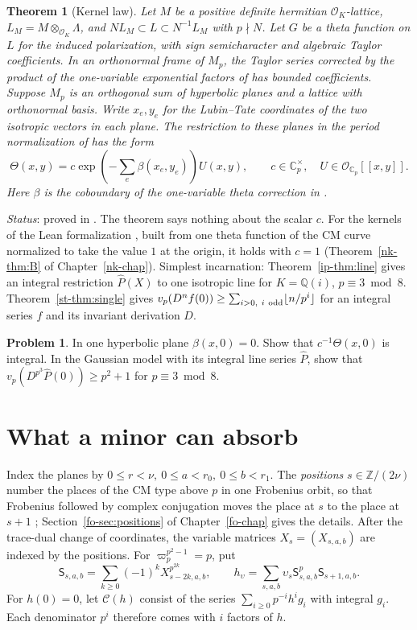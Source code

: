 \documentclass[reqno]{amsart}
\newcounter{chap}
\theoremstyle{definition}
\newtheorem{problem}{Problem}[section]
\theoremstyle{plain}
\newtheorem{theorem}{Theorem}[section]
\newcommand{\Z}{\mathbb Z}
\newcommand{\Q}{\mathbb Q}
\newcommand{\Oc}{\mathcal O}
\begin{document}
\begin{theorem}[Kernel law]\label{thm:kernel}
Let \(M\) be a positive definite hermitian \(\Oc_K\)-lattice, \(L_M=M\otimes_{\Oc_K}\Lambda\), and \(NL_M\subset L\subset N^{-1}L_M\) with \(p\nmid N\). Let \(G\) be a theta function on \(L\) for the induced polarization, with sign semicharacter and algebraic Taylor coefficients. In an orthonormal frame of \(M_p\), the Taylor series corrected by the product of the one-variable exponential factors of \cite[Thm.~8.19]{Adr} has bounded coefficients. Suppose \(M_p\) is an orthogonal sum of hyperbolic planes and a lattice with orthonormal basis. Write \(x_e,y_e\) for the Lubin--Tate coordinates of the two isotropic vectors in each plane. The restriction to these planes in the period normalization of \cite[Thm.~8.21]{Adr} has the form
\[
 \Theta(x,y)=c\exp\!\left(-\sum_e\beta(x_e,y_e)\right)U(x,y),
 \qquad c\in\mathbb C_p^\times,\quad U\in\Oc_{\mathbb C_p}[[x,y]] .
\]
Here \(\beta\) is the coboundary of the one-variable theta correction in \cite[Eq.~(8.6)]{Adr}.
\end{theorem}
\noindent \emph{Status}: proved in \cite{Adr}.  The theorem says nothing about the scalar \(c\).  For the kernels of the Lean formalization \cite{Lean}, built from one theta function of the CM curve normalized to take the value \(1\) at the origin, it holds with \(c=1\) (Theorem~\ref{nk-thm:B} of Chapter~\ref{nk-chap}).  Simplest incarnation: Theorem~\ref{ip-thm:line} gives an integral restriction \(\widehat P(X)\) to one isotropic line for \(K=\Q(i)\), \(p\equiv3\bmod8\). Theorem~\ref{st-thm:single} gives \(v_p(D^n f(0))\ge\sum_{i>0,\ i\ {\rm odd}}\lfloor n/p^i\rfloor\) for an integral series \(f\) and its invariant derivation \(D\).

\begin{problem}\label{pr:line}
In one hyperbolic plane \(\beta(x,0)=0\). Show that \(c^{-1}\Theta(x,0)\) is integral. In the Gaussian model with its integral line series \(\widehat P\), show that \(v_p(D^{p^3}\widehat P(0))\ge p^2+1\) for \(p\equiv3\bmod8\).
\end{problem}

\section{What a minor can absorb}\label{sec:minors}
Index the planes by \(0\le r<\nu,\ 0\le a<r_0,\ 0\le b<r_1\). The \emph{positions} \(s\in\Z/(2\nu)\) number the places of the CM type above \(p\) in one Frobenius orbit, so that Frobenius followed by complex conjugation moves the place at \(s\) to the place at \(s+1\) \cite[\S11.1]{Adr}; Section~\ref{fo-sec:positions} of Chapter~\ref{fo-chap} gives the details.  After the trace-dual change of coordinates, the variable matrices \(X_s=(X_{s,a,b})\) are indexed by the positions. For \(\varpi_p^{p^2-1}=p\), put
\[
 \mathsf S_{s,a,b}=\sum_{k\ge0}(-1)^k X_{s-2k,a,b}^{p^{2k}},
 \qquad h_\upsilon=\sum_{s,a,b}\upsilon_s\mathsf S_{s,a,b}^p\mathsf S_{s+1,a,b}.
\]
For \(h(0)=0\), let \(\mathcal C(h)\) consist of the series \(\sum_{i\ge0}p^{-i}h^ig_i\) with integral \(g_i\). Each denominator \(p^i\) therefore comes with \(i\) factors of \(h\).
\end{document}
